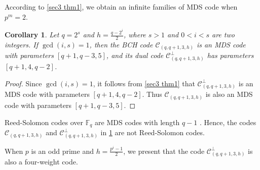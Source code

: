 \documentclass[sn-mathphys-num]{sn-jnl}%
\theoremstyle{thmstyleone}%
\newtheorem{corollary}{Corollary}
\theoremstyle{thmstyletwo}%
\theoremstyle{thmstylethree}%
\begin{document}
According to \cref{sec3 thm1}, we obtain an infinite families of MDS code when $p^m=2$.
\begin{corollary}\label{sec3 cor1}
	Let $q=2^s$ and $h=\frac{q-2^i}{2}$, where $s>1$ and $0<i<s$ are two integers. If $\gcd(i,s)=1$, then the BCH code $\mathcal{C}_{(q,q+1,3,h)}$ is an MDS code with parameters $[q+1,q-3,5]$, and its dual code $\mathcal{C}^\perp_{(q,q+1,3,h)}$ has parameters $[q+1,4,q-2]$.
\end{corollary}
\begin{proof}
	Since $\gcd(i,s)=1$, it follows from \cref{sec3 thm1} that $\mathcal{C}^\perp_{(q,q+1,3,h)}$ is an MDS code with parameters $[q+1,4,q-2]$. Thus $\mathcal{C}_{(q,q+1,3,h)}$ is also an MDS code with parameters $[q+1,q-3,5]$.
\end{proof}

Reed-Solomon codes over $\mathbb{F}_q$ are MDS codes with length $q-1$ \cite[pp. 173]{Huffman2003FundamentalErrorCodes}. Hence, the codes $\mathcal{C}_{(q,q+1,3,h)}$ and $\mathcal{C}^\perp_{(q,q+1,3,h)}$ in \cref{sec3 cor1} are not Reed-Solomon codes.

When $p$ is an odd prime and $h=\frac{p^i-1}{2}$, we present that the code $\mathcal{C}^\perp_{(q,q+1,3,h)}$ is also a four-weight code.
\end{document}
